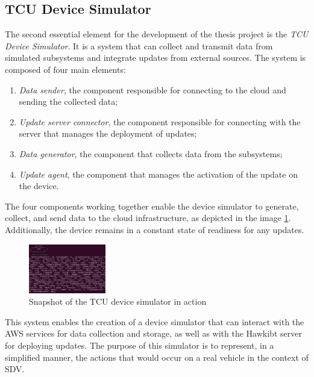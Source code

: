 \documentclass[10pt,a4paper,roman, twocolumn]{article}
\begin{document}
\subsection{TCU Device Simulator}
The second essential element for the development of the thesis project is the \textit{TCU Device Simulator}. It is a system that can collect and transmit data from simulated subsystems and integrate updates from external sources. The system is composed of four main elements:
\begin{enumerate}
	\setlength\itemsep{-0.3em}
	\item \textit{Data sender}, the component responsible for connecting to the cloud and sending the collected data;
	\item \textit{Update server connector}, the component responsible for connecting with the server that manages the deployment of updates;
	\item \textit{Data generator}, the component that collects data from the subsystems;
	\item \textit{Update agent}, the component that manages the activation of the update on the device.
\end{enumerate}

The four components working together enable the device simulator to generate, collect, and send data to the cloud infrastructure, as depicted in the image \ref{fig:TCUSimulatorP}. Additionally, the device remains in a constant state of readiness for any updates.
\begin{figure} [tbh]
	\centerline{\includegraphics[width=0.3\textwidth]{images/TCUSimulatorP.png}}
	\caption{Snapshot of the TCU device simulator in action}
	\label{fig:TCUSimulatorP}
\end{figure}

This system enables the creation of a device simulator that can interact with the AWS services for data collection and storage, as well as with the Hawkibt server for deploying updates. The purpose of this simulator is to represent, in a simplified manner, the actions that would occur on a real vehicle in the context of SDV.
\end{document}
